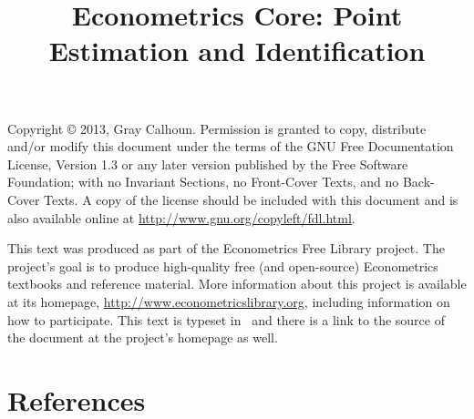 \documentclass[nofonts]{tufte-latex/tufte-handout}
\title{Econometrics Core: Point Estimation and Identification}
\begin{document}
\maketitle

\bigskip\noindent%
Copyright © 2013, Gray Calhoun.  Permission is granted to copy,
distribute and/or modify this document under the terms of the GNU Free
Documentation License, Version 1.3 or any later version published by
the Free Software Foundation; with no Invariant Sections, no
Front-Cover Texts, and no Back-Cover Texts.  A copy of the license
should be included with this document and is also available online at
\url{http://www.gnu.org/copyleft/fdl.html}.

This text was produced as part of the Econometrics Free Library
project.  The project's goal is to produce high-quality free (and
open-source) Econometrics textbooks and reference material.  More
information about this project is available at its homepage,
\url{http://www.econometricslibrary.org}, including information on how
to participate.  This text is typeset in \XeLaTeX\ and there is a link
to the source of the document at the project's homepage as well.

%
\tableofcontents














\part*{References}%

\end{document}
